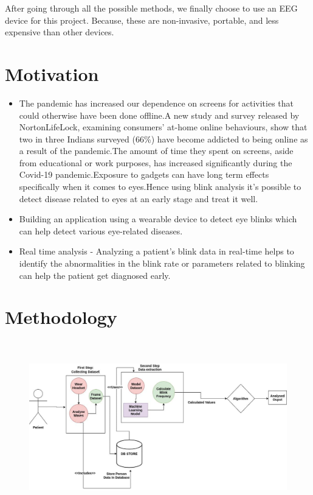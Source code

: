 After going through all the possible methods, we finally choose to use an EEG device for this project. Because, these are non-invasive, portable, and less expensive than other devices.


\section*{Motivation}
\begin{itemize}
\item The pandemic has increased our dependence on screens for activities that could otherwise have been done offline.A new study and survey  released by NortonLifeLock, examining consumers’ at-home online behaviours, show that two in three Indians surveyed (66\%) have become addicted to being online as a result of the pandemic.The amount of time they spent on screens, aside from educational or work purposes, has increased significantly during the Covid-19 pandemic.Exposure to gadgets can have long term effects specifically when it comes to eyes.Hence using blink analysis it's possible to detect disease related to eyes at an early stage and treat it well.
\item Building an application using a wearable device to detect eye blinks which can help detect various eye-related diseases.
\item Real time analysis -  Analyzing a patient's blink data in real-time helps to identify the abnormalities in the blink rate or parameters related to blinking can help the patient get diagnosed early.
\end{itemize}

\section*{Methodology}
\begin{figure}[h]
    \centering
    \includegraphics[height=7.5cm]{images/uml.jpg}
\end{figure}

